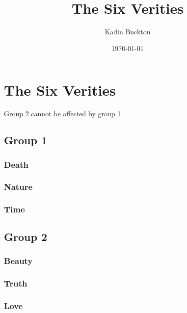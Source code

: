 \documentclass[11pt]{article}
\author{Kadin Buckton}
\date{\today}
\title{The Six Verities}
\begin{document}
\maketitle

\section*{The Six Verities}
\label{sec:org3ddbf8b}

Group 2 cannot be affected by group 1.

\subsection*{Group 1}
\label{sec:orgd7c72cb}

\subsubsection*{Death}
\label{sec:org2cbbf7f}

\subsubsection*{Nature}
\label{sec:orgda0e28c}

\subsubsection*{Time}
\label{sec:orgc406b78}

\subsection*{Group 2}
\label{sec:org61bb4e7}

\subsubsection*{Beauty}
\label{sec:org575b982}

\subsubsection*{Truth}
\label{sec:org3a10a73}

\subsubsection*{Love}
\label{sec:org29d8c6d}
\end{document}
